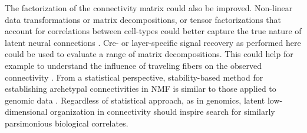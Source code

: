 The factorization of the connectivity matrix could also be improved.
Non-linear data transformations or matrix decompositions, or tensor factorizations that account for correlations between cell-types could better capture the true nature of latent neural connections \citep{Harris2016-fn}.
Cre- or layer-specific signal recovery as performed here could be used to evaluate a range of matrix decompositions.
This could help for example to understand the influence of traveling fibers on the observed connectivity \citep{Llano2008-ne}.
From a statistical perspective, stability-based method for establishing archetypal connectivities in NMF is similar to those applied to genomic data \cite{Wu2016-gg, Kotliar2019-yj}.
Regardless of statistical approach, as in genomics, latent low-dimensional organization in connectivity should inspire search for similarly parsimonious biological correlates.